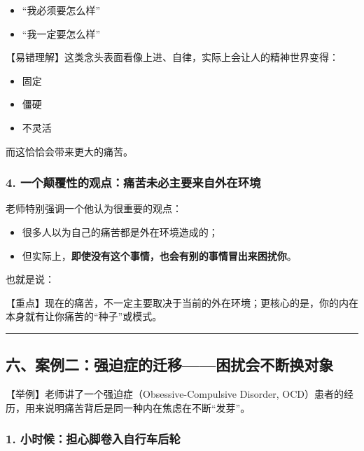 \documentclass[
  chinese,
  9pt,
  a4paper,
]{ctexart}
\providecommand{\tightlist}{%
  \setlength{\itemsep}{0pt}\setlength{\parskip}{0pt}}
\begin{document}
\begin{itemize}
\tightlist
\item
  ``我必须要怎么样''
\item
  ``我一定要怎么样''
\end{itemize}

【易错理解】这类念头表面看像上进、自律，实际上会让人的精神世界变得：

\begin{itemize}
\tightlist
\item
  固定
\item
  僵硬
\item
  不灵活
\end{itemize}

而这恰恰会带来更大的痛苦。

\subsubsection{4.
一个颠覆性的观点：痛苦未必主要来自外在环境}\label{ux4e00ux4e2aux98a0ux8986ux6027ux7684ux89c2ux70b9ux75dbux82e6ux672aux5fc5ux4e3bux8981ux6765ux81eaux5916ux5728ux73afux5883}

老师特别强调一个他认为很重要的观点：

\begin{itemize}
\tightlist
\item
  很多人以为自己的痛苦都是外在环境造成的；
\item
  但实际上，\textbf{即使没有这个事情，也会有别的事情冒出来困扰你}。
\end{itemize}

也就是说：

【重点】现在的痛苦，不一定主要取决于当前的外在环境；更核心的是，你的内在本身就有让你痛苦的``种子''或模式。

\begin{center}\rule{0.5\linewidth}{0.5pt}\end{center}

\subsection{六、案例二：强迫症的迁移------困扰会不断换对象}\label{ux516dux6848ux4f8bux4e8cux5f3aux8febux75c7ux7684ux8fc1ux79fbux56f0ux6270ux4f1aux4e0dux65adux6362ux5bf9ux8c61}

【举例】老师讲了一个强迫症（Obsessive-Compulsive Disorder,
OCD）患者的经历，用来说明痛苦背后是同一种内在焦虑在不断``发芽''。

\subsubsection{1.
小时候：担心脚卷入自行车后轮}\label{ux5c0fux65f6ux5019ux62c5ux5fc3ux811aux5377ux5165ux81eaux884cux8f66ux540eux8f6e}
\end{document}
